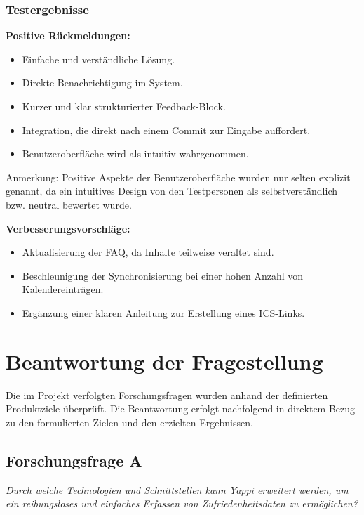\documentclass[12pt,a4paper]{report}
\begin{document}
    \subsubsection{Testergebnisse}

        \textbf{Positive Rückmeldungen:}
        \begin{itemize}
            \item Einfache und verständliche Lösung.
            \item Direkte Benachrichtigung im System.
            \item Kurzer und klar strukturierter Feedback-Block.
            \item Integration, die direkt nach einem Commit zur Eingabe auffordert.
            \item Benutzeroberfläche wird als intuitiv wahrgenommen.
        \end{itemize}
        Anmerkung: Positive Aspekte der Benutzeroberfläche wurden nur selten explizit genannt, da ein intuitives Design von den Testpersonen als selbstverständlich bzw. neutral bewertet wurde.

        \textbf{Verbesserungsvorschläge:}
        \begin{itemize}
            \item Aktualisierung der FAQ, da Inhalte teilweise veraltet sind.
            \item Beschleunigung der Synchronisierung bei einer hohen Anzahl von Kalendereinträgen.
            \item Ergänzung einer klaren Anleitung zur Erstellung eines ICS-Links.
        \end{itemize}







\section{Beantwortung der Fragestellung}

    Die im Projekt verfolgten Forschungsfragen wurden anhand der definierten Produktziele überprüft. Die Beantwortung
    erfolgt nachfolgend in direktem Bezug zu den formulierten Zielen und den erzielten Ergebnissen.

    \subsection*{Forschungsfrage A}
    \textit{Durch welche Technologien und Schnittstellen kann Yappi erweitert werden, um ein reibungsloses und einfaches
    Erfassen von Zufriedenheitsdaten zu ermöglichen?}
\end{document}
